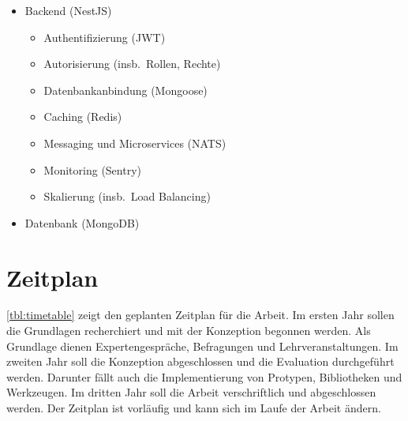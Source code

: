 \begin{itemize}
\begin{itemize}
    \end{itemize}
    \item Backend (NestJS)
    \begin{itemize}
        \item Authentifizierung (JWT)
        \item Autorisierung (insb.\ Rollen, Rechte)
        \item Datenbankanbindung (Mongoose)
        \item Caching (Redis)
        \item Messaging und Microservices (NATS)
        \item Monitoring (Sentry)
        \item Skalierung (insb.\ Load Balancing)
    \end{itemize}
    \item Datenbank (MongoDB)
\end{itemize}

\section{Zeitplan}\label{sec:zeitplan}

\autoref{tbl:timetable} zeigt den geplanten Zeitplan für die Arbeit.
Im ersten Jahr sollen die Grundlagen recherchiert und mit der Konzeption begonnen werden.
Als Grundlage dienen Expertengespräche, Befragungen und Lehrveranstaltungen.
Im zweiten Jahr soll die Konzeption abgeschlossen und die Evaluation durchgeführt werden.
Darunter fällt auch die Implementierung von Protypen, Bibliotheken und Werkzeugen.
Im dritten Jahr soll die Arbeit verschriftlich und abgeschlossen werden.
Der Zeitplan ist vorläufig und kann sich im Laufe der Arbeit ändern.

